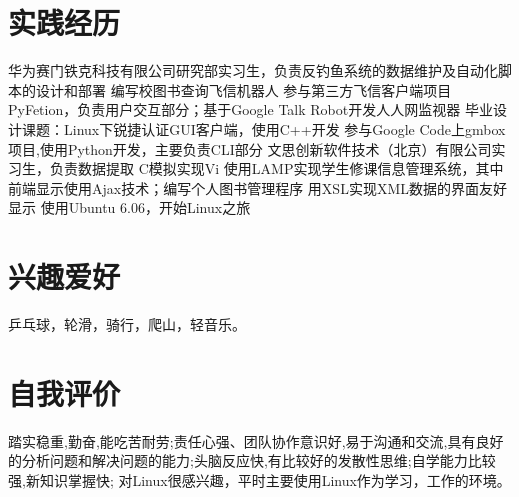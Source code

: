 \documentclass[a4paper]{moderncv}
\begin{document}
\begin{CJK*}{UTF8}{gbsn}
\section{实践经历}
{ 华为赛门铁克科技有限公司研究部实习生，负责反钓鱼系统的数据维护及自动化脚本的设计和部署}
{ 编写校图书查询飞信机器人}
{ 参与第三方飞信客户端项目PyFetion，负责用户交互部分；基于Google Talk Robot开发人人网监视器}
{ 毕业设计课题：Linux下锐捷认证GUI客户端，使用C++开发 }
{ 参与Google Code上gmbox项目,使用Python开发，主要负责CLI部分 }
{ 文思创新软件技术（北京）有限公司实习生，负责数据提取 }
{ C模拟实现Vi }
{ 使用LAMP实现学生修课信息管理系统，其中前端显示使用Ajax技术；编写个人图书管理程序 }
{ 用XSL实现XML数据的界面友好显示 }
{ 使用Ubuntu 6.06，开始Linux之旅}
\section{兴趣爱好}
\cvitem{}
{
\small 乒乓球，轮滑，骑行，爬山，轻音乐。
}
\section{自我评价}
\cvitem{}{}
{

踏实稳重,勤奋,能吃苦耐劳;责任心强、团队协作意识好,易于沟通和交流,具有良好的分析问题和解决问题的能力;头脑反应快,有比较好的发散性思维;自学能力比较强,新知识掌握快;
对Linux很感兴趣，平时主要使用Linux作为学习，工作的环境。
}
\closesection
\end{CJK*}
\end{document}
